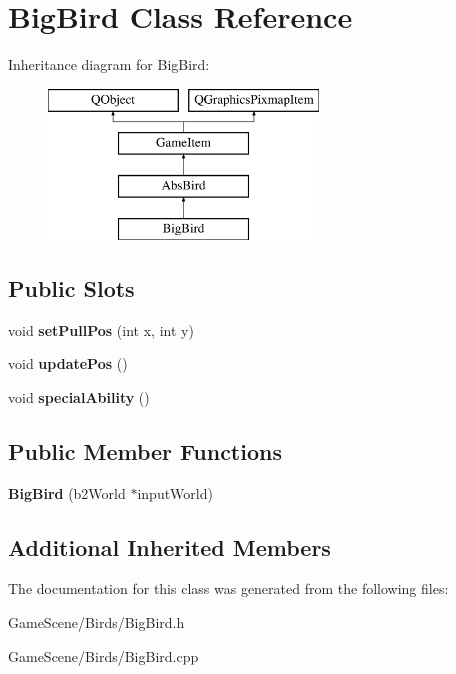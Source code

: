 \hypertarget{classBigBird}{}\section{Big\+Bird Class Reference}
\label{classBigBird}
Inheritance diagram for Big\+Bird\+:\begin{figure}[H]
\begin{center}
\leavevmode
\includegraphics[height=4.000000cm]{classBigBird}
\end{center}
\end{figure}
\subsection*{Public Slots}
\begin{DoxyCompactItemize}
\item 
void {\bfseries set\+Pull\+Pos} (int x, int y)\hypertarget{classBigBird_a323a0647de091d51d04cf8c4cb284d75}{}\label{classBigBird_a323a0647de091d51d04cf8c4cb284d75}

\item 
void {\bfseries update\+Pos} ()\hypertarget{classBigBird_aca8b3e130311603afe47dabdc4af1e27}{}\label{classBigBird_aca8b3e130311603afe47dabdc4af1e27}

\item 
void {\bfseries special\+Ability} ()\hypertarget{classBigBird_a374b32ac67f4e3d1bf0cd05fc5564252}{}\label{classBigBird_a374b32ac67f4e3d1bf0cd05fc5564252}

\end{DoxyCompactItemize}
\subsection*{Public Member Functions}
\begin{DoxyCompactItemize}
\item 
{\bfseries Big\+Bird} (b2\+World $\ast$input\+World)\hypertarget{classBigBird_ab63f9969f3c08fd623a5f9e1e034d18d}{}\label{classBigBird_ab63f9969f3c08fd623a5f9e1e034d18d}

\end{DoxyCompactItemize}
\subsection*{Additional Inherited Members}


The documentation for this class was generated from the following files\+:\begin{DoxyCompactItemize}
\item 
Game\+Scene/\+Birds/Big\+Bird.\+h\item 
Game\+Scene/\+Birds/Big\+Bird.\+cpp\end{DoxyCompactItemize}
